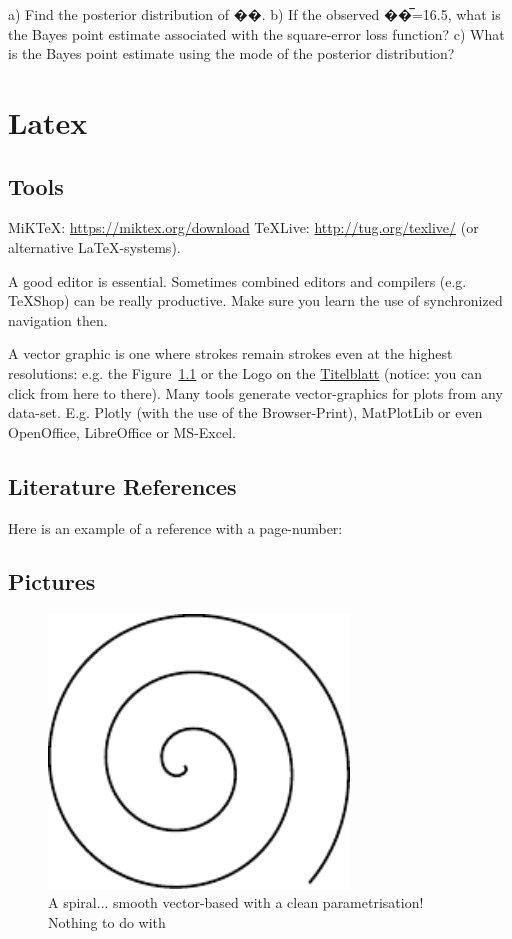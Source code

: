 a) Find the posterior distribution of ��.
b) If the observed ��̅=16.5, what is the Bayes point estimate associated with the square-error loss function?
c) What is the Bayes point estimate using the mode of the posterior distribution?





\chapter{Latex}

\section{Tools}

MiKTeX: \url{https://miktex.org/download}
TeXLive: \url{http://tug.org/texlive/}
 (or alternative LaTeX-systems).
 
 A good editor is essential. Sometimes combined editors and compilers (e.g. TeXShop) can be really productive. Make sure you learn the use of synchronized navigation then.

A vector graphic is one where strokes remain strokes even at the highest resolutions: e.g. the Figure~\ref{fig:spiral} or the Logo on the \hyperref[titlePage]{Titelblatt} (notice: you can click from here to there).
Many tools generate vector-graphics for plots from any data-set. E.g. Plotly (with the use of the Browser-Print), MatPlotLib or even OpenOffice, LibreOffice or MS-Excel.

\section{Literature References}
Here is an example of a reference with a page-number: \cite[S. 6]{DueckKo:2016}


\section{Pictures}

\begin{figure}[h]
\centering
\includegraphics[width=8cm]{pics/spiral.pdf}
\caption{A spiral... smooth vector-based with a clean parametrisation! \\ Nothing to do with \cite{Gage:18}}\label{fig:spiral}
\end{figure}
\FloatBarrier

